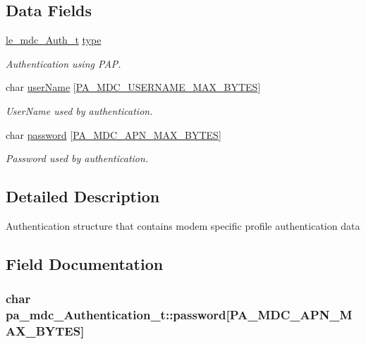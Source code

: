 \subsection*{Data Fields}
\begin{DoxyCompactItemize}
\item 
\hyperlink{le__mdc__interface_8h_ae9758eecfab89fbc1bc01341393a7723}{le\+\_\+mdc\+\_\+\+Auth\+\_\+t} \hyperlink{structpa__mdc___authentication__t_a3825fb8da976396a3e278b11ccf40c20}{type}
\begin{DoxyCompactList}\small\item\em Authentication using P\+AP. \end{DoxyCompactList}\item 
char \hyperlink{structpa__mdc___authentication__t_a5c1bf69d2864d11f5dc20a1033bf0508}{user\+Name} \mbox{[}\hyperlink{pa__mdc_8h_ab3ce12ea70b612b2496626323a848009}{P\+A\+\_\+\+M\+D\+C\+\_\+\+U\+S\+E\+R\+N\+A\+M\+E\+\_\+\+M\+A\+X\+\_\+\+B\+Y\+T\+ES}\mbox{]}
\begin{DoxyCompactList}\small\item\em User\+Name used by authentication. \end{DoxyCompactList}\item 
char \hyperlink{structpa__mdc___authentication__t_a95cc56a00e89b453cff6377362823f52}{password} \mbox{[}\hyperlink{pa__mdc_8h_a1d502fe139e71614c1da3ce86b77845b}{P\+A\+\_\+\+M\+D\+C\+\_\+\+A\+P\+N\+\_\+\+M\+A\+X\+\_\+\+B\+Y\+T\+ES}\mbox{]}
\begin{DoxyCompactList}\small\item\em Password used by authentication. \end{DoxyCompactList}\end{DoxyCompactItemize}


\subsection{Detailed Description}
Authentication structure that contains modem specific profile authentication data 

\subsection{Field Documentation}
\subsubsection[{\texorpdfstring{password}{password}}]{\setlength{\rightskip}{0pt plus 5cm}char pa\+\_\+mdc\+\_\+\+Authentication\+\_\+t\+::password\mbox{[}{\bf P\+A\+\_\+\+M\+D\+C\+\_\+\+A\+P\+N\+\_\+\+M\+A\+X\+\_\+\+B\+Y\+T\+ES}\mbox{]}}\hypertarget{structpa__mdc___authentication__t_a95cc56a00e89b453cff6377362823f52}{}\label{structpa__mdc___authentication__t_a95cc56a00e89b453cff6377362823f52}


